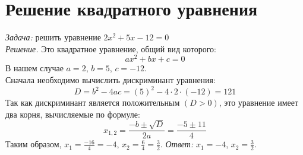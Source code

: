 \documentclass{article}
\begin{document}
\section{Решение квадратного уравнения}
	\textit{Задача:} решить уравнение $2x^2 + 5x - 12 = 0$\\
    \hspace*{0.5cm}\textit{Решение.} Это квадратное уравнение, общий вид которого:
    $$ax^2+bx+c=0$$
    В нашем случае $a=2$, $b=5$, $c=-12$.\\
    \hspace*{0.5cm}Сначала необходимо вычислить дискриминант уравнения:
    $$D=b^2-4ac={(5)}^2-4\cdot2\cdot(-12)=121$$
    Так как дискриминант является положительным $(D>0)$, это уравнение имеет два корня, вычисляемые по формуле:
    $$
        x_{1,2}=\frac{-b\pm\sqrt{D}}{2a}=\frac{-5\pm11}{4}
    $$
    Таким образом, $x_1=\frac{-16}{4}=-4$, $x_2=\frac{6}{4}=\frac{3}{2}$.
    \newline\hspace*{0.5cm}\textit{Ответ:} $x_1=-4$, $x_2=\frac{3}{2}$.
\end{document}
